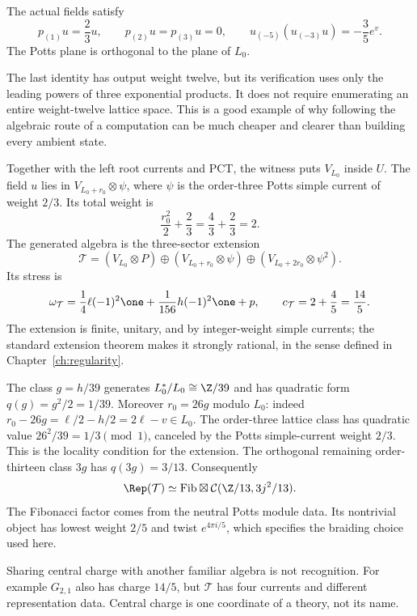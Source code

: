 \begin{constructioninput}
The actual fields satisfy
\[
 p_{(1)}u=\frac23u,\qquad p_{(2)}u=p_{(3)}u=0,
 \qquad u_{(-5)}(u_{(-3)}u)=-\frac35e^v.
\]
The Potts plane is orthogonal to the plane of $L_0$.
\end{constructioninput}

The last identity has output weight twelve, but its verification uses
only the leading powers of three exponential products. It does not
require enumerating an entire weight-twelve lattice space. This is a
good example of why following the algebraic route of a computation can
be much cheaper and clearer than building every ambient state.

Together with the left root currents and PCT, the witness puts
$V_{L_0}$ inside $U$. The field $u$ lies in
$V_{L_0+r_0}\otimes\psi$, where $\psi$ is the order-three Potts
simple current of weight $2/3$. Its total weight is
\[
 \frac{r_0^2}{2}+\frac23=\frac43+\frac23=2.
\]
The generated algebra is the three-sector extension
\begin{equation}\label{eq:c-core-T}
 \mathcal T=(V_{L_0}\otimes P)
 \oplus(V_{L_0+r_0}\otimes\psi)
 \oplus(V_{L_0+2r_0}\otimes\psi^2).
\end{equation}
Its stress is
\[
 \omega_{\mathcal T}=\frac14\ell(-1)^2\one
                         +\frac1{156}h(-1)^2\one+p,
 \qquad c_{\mathcal T}=2+\frac45=\frac{14}{5}.
\]
The extension is finite, unitary, and by integer-weight simple currents;
the standard extension theorem makes it strongly rational, in the sense
defined in Chapter~\ref{ch:regularity}.

\begin{example}
The class $g=h/39$ generates $L_0^*/L_0\cong\Z/39$ and has
quadratic form $q(g)=g^2/2=1/39$. Moreover $r_0=26g$ modulo
$L_0$: indeed $r_0-26g=\ell/2-h/2=2\ell-v\in L_0$.
The order-three lattice class has quadratic value
$26^2/39=1/3\pmod1$, canceled by the Potts simple-current weight
$2/3$. This is the locality condition for the extension. The
orthogonal remaining order-thirteen class $3g$ has
$q(3g)=3/13$. Consequently
\[
 \Rep(\mathcal T)\simeq
 \mathrm{Fib}\boxtimes\mathcal C(\Z/13,3j^2/13).
\]
The Fibonacci factor comes from the neutral Potts module data.
Its nontrivial object has lowest weight $2/5$ and twist
$e^{4\pi i/5}$, which specifies the braiding choice used here.
\end{example}

Sharing central charge with another familiar algebra is not recognition.
For example $G_{2,1}$ also has charge $14/5$, but $\mathcal T$ has
four currents and different representation data. Central charge is one
coordinate of a theory, not its name.

